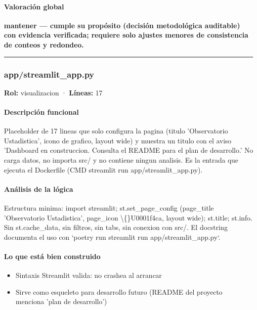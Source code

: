 \paragraph{Valoración global}
\textbf{mantener --- cumple su propósito (decisión metodológica auditable) con evidencia verificada; requiere solo ajustes menores de consistencia de conteos y redondeo.}

\medskip
\hrule

\subsubsection{app/streamlit\_app.py}
\textbf{Rol:} visualizacion · \textbf{Líneas:} 17

\paragraph{Descripción funcional}
Placeholder de 17 lineas que solo configura la pagina (titulo 'Observatorio Ustadistica', icono de grafico, layout wide) y muestra un titulo con el aviso 'Dashboard en construccion. Consulta el README para el plan de desarrollo.' No carga datos, no importa src/ y no contiene ningun analisis. Es la entrada que ejecuta el Dockerfile (CMD streamlit run app/streamlit\_app.py).

\paragraph{Análisis de la lógica}
Estructura minima: import streamlit; st.set\_page\_config (page\_title 'Observatorio Ustadistica', page\_icon \textbackslash\{\}U0001f4ca, layout wide); st.title; st.info. Sin st.cache\_data, sin filtros, sin tabs, sin conexion con src/. El docstring documenta el uso con `poetry run streamlit run app/streamlit\_app.py`.

\paragraph{Lo que está bien construido}
\begin{itemize}
  \item Sintaxis Streamlit valida: no crashea al arrancar
  \item Sirve como esqueleto para desarrollo futuro (README del proyecto menciona 'plan de desarrollo')
\end{itemize}

